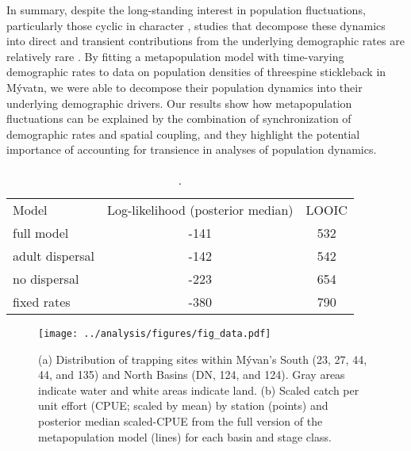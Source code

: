 \documentclass[11pt]{article}
\begin{document}
In summary, despite the long-standing interest in population fluctuations,
particularly those cyclic in character 
\citep{elton1924, nicholson1935},
studies that decompose these dynamics into direct and transient contributions 
from the underlying demographic rates are relatively rare 
\citep{fox2000population, koons2017understanding, hoy2020fluctuations}.
By fitting a metapopulation model with time-varying demographic rates to 
data on population densities of threespine stickleback in M\'{y}vatn,
we were able to decompose their population dynamics into their 
underlying demographic drivers.
Our results show how metapopulation fluctuations can be explained by the combination of synchronization of demographic rates and spatial coupling, 
and they highlight the potential importance of accounting for transience in analyses of population dynamics.









\clearpage
\begin{table}
\caption{\label{tab:compare}
.
}
\setlength{\tabcolsep}{12pt}
\begin{tabular}{lcc}
\toprule
Model                  &    Log-likelihood (posterior median) & LOOIC \\
\cmidrule{1-3}
full model             & -141 & 532 \\
adult dispersal        & -142 & 542 \\
no dispersal           & -223 & 654 \\
fixed rates            & -380 & 790 \\
\bottomrule
\end{tabular}
\end{table}
\clearpage

\clearpage
\begin{figure}
\centering
\texttt{[image: ../analysis/figures/fig\_data.pdf]}
\caption{\label{fig:data}
(a) Distribution of trapping sites within M\'{y}van's
South (23, 27, 44, 44, and 135) and North Basins (DN, 124, and 124). 
Gray areas indicate water and white areas indicate land.
(b) Scaled catch per unit effort (CPUE; scaled by mean) by station (points) and 
posterior median scaled-CPUE from the full version of the metapopulation model (lines)
for each basin and stage class.
}
\end{figure}
\clearpage
\end{document}
